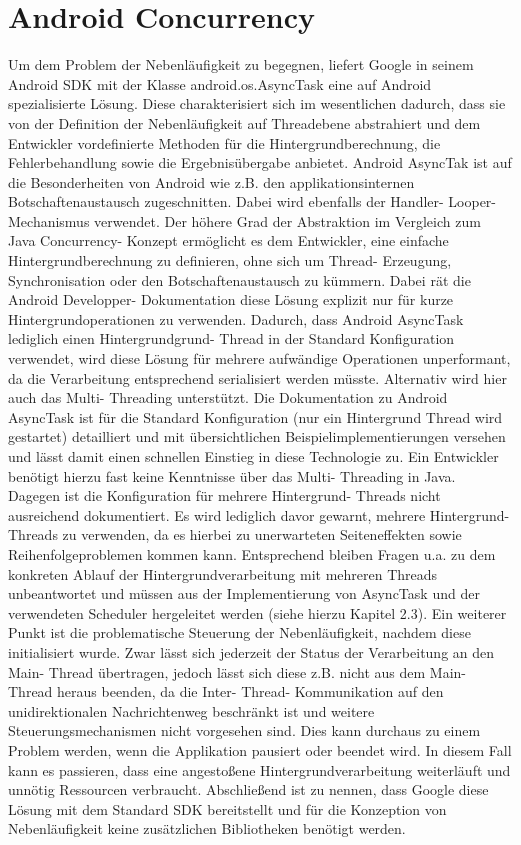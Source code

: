 \documentclass[12pt,oneside,a4paper,bibtotoc,liststotoc]{scrreprt}
\begin{document}
\section{Android Concurrency}
Um dem Problem der Nebenläufigkeit zu begegnen, liefert Google in seinem Android SDK mit der Klasse android.os.AsyncTask eine auf Android spezialisierte Lösung. Diese charakterisiert sich im wesentlichen dadurch, dass sie von der Definition der Nebenläufigkeit auf Threadebene abstrahiert und dem Entwickler vordefinierte Methoden für die Hintergrundberechnung, die Fehlerbehandlung sowie die Ergebnisübergabe anbietet. Android AsyncTak ist auf die Besonderheiten von Android wie z.B. den applikationsinternen Botschaftenaustausch zugeschnitten. Dabei wird ebenfalls der Handler- Looper- Mechanismus verwendet. Der höhere Grad der Abstraktion im Vergleich zum Java Concurrency- Konzept ermöglicht es dem Entwickler, eine einfache Hintergrundberechnung zu definieren, ohne sich um Thread- Erzeugung, Synchronisation oder den Botschaftenaustausch zu kümmern. Dabei rät die Android Developper- Dokumentation diese Lösung explizit nur für kurze Hintergrundoperationen zu verwenden. Dadurch, dass Android AsyncTask lediglich einen Hintergrundgrund- Thread in der Standard Konfiguration verwendet, wird diese Lösung für mehrere aufwändige Operationen unperformant, da die Verarbeitung entsprechend serialisiert werden müsste. Alternativ wird hier auch das Multi- Threading unterstützt. Die Dokumentation zu Android AsyncTask ist für die Standard Konfiguration (nur ein Hintergrund Thread wird gestartet) detailliert und mit übersichtlichen Beispielimplementierungen versehen und lässt damit einen  schnellen Einstieg in diese Technologie zu. Ein Entwickler benötigt hierzu fast keine Kenntnisse über das Multi- Threading in Java. Dagegen ist die Konfiguration für mehrere Hintergrund- Threads nicht ausreichend dokumentiert. Es wird lediglich davor gewarnt, mehrere Hintergrund- Threads zu verwenden, da es hierbei zu unerwarteten Seiteneffekten sowie Reihenfolgeproblemen kommen kann. Entsprechend bleiben Fragen u.a. zu dem konkreten Ablauf der Hintergrundverarbeitung mit mehreren Threads unbeantwortet und müssen aus der Implementierung von AsyncTask und der verwendeten Scheduler hergeleitet werden (siehe hierzu Kapitel 2.3).\newline
Ein weiterer Punkt ist die problematische Steuerung der Nebenläufigkeit, nachdem diese initialisiert wurde. Zwar lässt sich jederzeit der Status der Verarbeitung an den Main- Thread übertragen, jedoch lässt sich diese z.B. nicht aus dem Main- Thread heraus beenden, da die Inter- Thread- Kommunikation auf den unidirektionalen Nachrichtenweg beschränkt ist und weitere Steuerungsmechanismen nicht vorgesehen sind. Dies kann durchaus zu einem Problem werden, wenn die Applikation pausiert oder beendet wird. In diesem Fall kann es passieren, dass eine angestoßene Hintergrundverarbeitung weiterläuft und unnötig Ressourcen verbraucht.\newline
Abschließend ist zu nennen, dass Google diese Lösung mit dem Standard SDK bereitstellt und für die Konzeption von Nebenläufigkeit keine zusätzlichen Bibliotheken benötigt werden.
\end{document}
